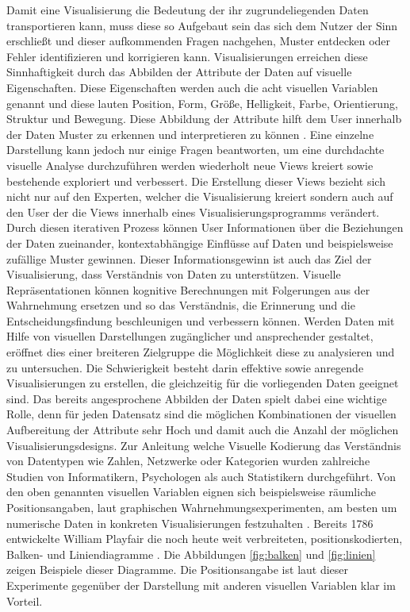\documentclass[draft=false
              ,paper=a4
              ,twoside=false
              ,fontsize=11pt
              ,headsepline
              ,BCOR10mm
              ,DIV11
              ]{scrbook}
\begin{document}
Damit eine Visualisierung die Bedeutung der ihr zugrundeliegenden Daten transportieren kann, muss diese so Aufgebaut sein das sich dem Nutzer der Sinn erschließt und dieser aufkommenden Fragen nachgehen, Muster entdecken oder Fehler identifizieren und korrigieren kann. Visualisierungen erreichen diese Sinnhaftigkeit durch das Abbilden der Attribute der Daten auf visuelle Eigenschaften. Diese Eigenschaften werden auch die acht visuellen Variablen genannt \cite{ward_interactive_2010} und diese lauten Position, Form, Größe, Helligkeit, Farbe, Orientierung, Struktur und Bewegung. Diese Abbildung der Attribute hilft dem User innerhalb der Daten Muster zu erkennen und interpretieren zu können \cite{card_readings_1999}. Eine einzelne Darstellung kann jedoch nur einige Fragen beantworten, um eine durchdachte visuelle Analyse durchzuführen werden wiederholt neue Views kreiert sowie bestehende exploriert und verbessert. Die Erstellung dieser Views bezieht sich nicht nur auf den Experten, welcher die Visualisierung kreiert sondern auch auf den User der die Views innerhalb eines Visualisierungsprogramms verändert. Durch diesen iterativen Prozess können User Informationen über die Beziehungen der Daten zueinander, kontextabhängige Einflüsse auf Daten und beispielsweise zufällige Muster gewinnen. Dieser Informationsgewinn ist auch das Ziel der Visualisierung, dass Verständnis von Daten zu unterstützen. Visuelle Repräsentationen können kognitive Berechnungen mit Folgerungen aus der Wahrnehmung ersetzen und so das Verständnis, die Erinnerung und die Entscheidungsfindung beschleunigen und verbessern können. Werden Daten mit Hilfe von visuellen Darstellungen zugänglicher und ansprechender gestaltet, eröffnet dies einer breiteren Zielgruppe die Möglichkeit diese zu analysieren und zu untersuchen. Die Schwierigkeit besteht darin effektive sowie anregende Visualisierungen zu erstellen, die gleichzeitig für die vorliegenden Daten geeignet sind.
Das bereits angesprochene Abbilden der Daten spielt dabei eine wichtige Rolle, denn für jeden Datensatz sind die möglichen Kombinationen der visuellen Aufbereitung der Attribute sehr Hoch und damit auch die Anzahl der möglichen Visualisierungsdesigns. Zur Anleitung welche Visuelle Kodierung das Verständnis von Datentypen wie Zahlen, Netzwerke oder Kategorien wurden zahlreiche Studien von Informatikern, Psychologen als auch Statistikern durchgeführt. Von den oben genannten visuellen Variablen eignen sich beispielsweise räumliche Positionsangaben, laut graphischen Wahrnehmungsexperimenten, am besten um numerische Daten in konkreten Visualisierungen festzuhalten \cite{heer_tour_2010}. Bereits 1786 entwickelte William Playfair die noch heute weit verbreiteten, positionskodierten, Balken- und Liniendiagramme \cite{playfair_playfairs_1768}. Die Abbildungen \ref{fig:balken} und \ref{fig:linien} zeigen Beispiele dieser Diagramme. Die Positionsangabe ist laut dieser Experimente gegenüber der Darstellung mit anderen visuellen Variablen klar im Vorteil. 
\end{document}
